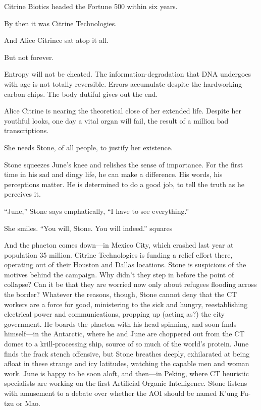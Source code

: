 Citrine Biotics headed the Fortune 500 within six years.

By then it was Citrine Technologies.

And Alice Citrince sat atop it all.

But not forever.

Entropy will not be cheated. The information-degradation that DNA undergoes with age is not totally reversible. Errors accumulate despite the hardworking carbon chips. The body dutiful gives out the end.

Alice Citrine is nearing the theoretical close of her extended life. Despite her youthful looks, one day a vital organ will fail, the result of a million bad transcriptions.

She needs Stone, of all people, to justify her existence.

Stone squeezes June’s knee and relishes the sense of importance. For the first time in his sad and dingy life, he can make a difference. His words, his perceptions matter. He is determined to do a good job, to tell the truth as he perceives it.

“June,” Stone says emphatically, “I have to see everything.”

She smiles. “You will, Stone. You will indeed.”
squares

And the phaeton comes down—in Mexico City, which crashed last year at population 35 million. Citrine Technologies is funding a relief effort there, operating out of their Houston and Dallas locations. Stone is suspicious of the motives behind the campaign. Why didn’t they step in before the point of collapse? Can it be that they are worried now only about refugees flooding across the border? Whatever the reasons, though, Stone cannot deny that the CT workers are a force for good, ministering to the sick and hungry, reestablishing electrical power and communications, propping up (acting as?) the city government. He boards the phaeton with his head spinning, and soon fmds himself—in the Antarctic, where he and June are choppered out from the CT domes to a krill-processing ship, source of so much of the world’s protein. June finds the frack stench offensive, but Stone breathes deeply, exhilarated at being afloat in these strange and icy latitudes, watching the capable men and woman work. June is happy to be soon aloft, and then—in Peking, where CT heuristic specialists are working on the first Artificial Organic Intelligence. Stone listens with amusement to a debate over whether the AOI should be named K’ung Fu-tzu or Mao.


